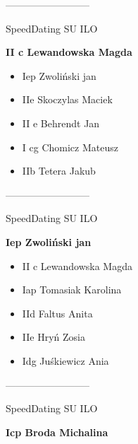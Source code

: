 \documentclass[a4paper,10pt]{article}
\begin{document}
\begin{multicols}{3}
\begin{minipage}[l]{\textwidth}
\begin{itemize}
    \end{itemize}



\end{minipage}



\begin{minipage}[l]{\textwidth}
--------------------------

  \footnotesize{SpeedDating SU ILO}

  \bfseries{II c Lewandowska Magda}

  \begin{itemize}
    \item Iep Zwoliński jan
    \item IIe Skoczylas Maciek
    \item II e Behrendt Jan
    \item I cg Chomicz Mateusz
    \item IIb Tetera Jakub

    \end{itemize}



\end{minipage}



\begin{minipage}[l]{\textwidth}
--------------------------

  \footnotesize{SpeedDating SU ILO}

  \bfseries{Iep Zwoliński jan}

  \begin{itemize}
    \item II c Lewandowska Magda
    \item Iap Tomasiak Karolina
    \item IId Faltus Anita
    \item IIe Hryń Zosia
    \item Idg Juśkiewicz Ania

    \end{itemize}



\end{minipage}



\begin{minipage}[l]{\textwidth}
--------------------------

  \footnotesize{SpeedDating SU ILO}

  \bfseries{Icp Broda Michalina}


\end{minipage}
\end{multicols}
\end{document}
